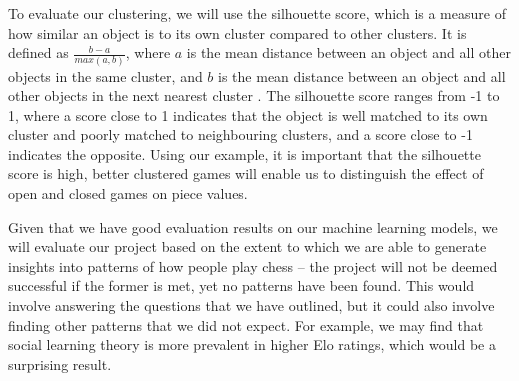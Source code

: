 \documentclass[%
 superscriptaddress,
showpacs,preprintnumbers,
 amsmath,
 amssymb,
 aps,
 pra,
showkeys,
onecolumn,
notitlepage,
11pt,
tightenlines      %
]{revtex4-1}
\begin{document}


To evaluate our clustering, we will use the silhouette score, which is a measure of how similar an object is to its own cluster compared to other clusters. It is defined as $\frac{b - a}{max(a, b)}$, where $a$ is the mean distance between an object and all other objects in the same cluster, and $b$ is the mean distance between an object and all other objects in the next nearest cluster \cite{shahapure2020cluster}. The silhouette score ranges from -1 to 1, where a score close to 1 indicates that the object is well matched to its own cluster and poorly matched to neighbouring clusters, and a score close to -1 indicates the opposite. Using our example, it is important that the silhouette score is high, better clustered games will enable us to distinguish the effect of open and closed games on piece values.

Given that we have good evaluation results on our machine learning models, we will evaluate our project based on the extent to which we are able to generate insights into patterns of how people play chess -- the project will not be deemed successful if the former is met, yet no patterns have been found. This would involve answering the questions that we have outlined, but it could also involve finding other patterns that we did not expect. For example, we may find that social learning theory is more prevalent in higher Elo ratings, which would be a surprising result. 
\end{document}
